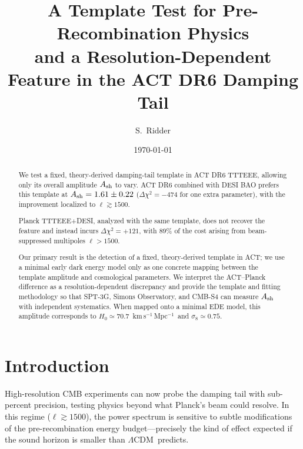 \documentclass[twocolumn,showpacs,preprintnumbers,amsmath,amssymb,prd]{revtex4-2}
\newcommand{\lcdm}{$\Lambda$CDM}
\newcommand{\kms}{km\,s$^{-1}$\,Mpc$^{-1}$}
\begin{document}
\title{A Template Test for Pre-Recombination Physics\\
and a Resolution-Dependent Feature in the ACT DR6 Damping Tail}

\author{S.~Ridder}

\date{\today}

\begin{abstract}
We test a fixed, theory-derived damping-tail template in ACT DR6 TTTEEE, 
allowing only its overall amplitude $A_{\rm sh}$ to vary. ACT DR6 combined 
with DESI BAO prefers this template at $A_{\rm sh} = 1.61 \pm 0.22$ 
($\Delta\chi^2 = -474$ for one extra parameter), with the improvement 
localized to $\ell \gtrsim 1500$. 

Planck TTTEEE+DESI, analyzed with the same template, does not recover the 
feature and instead incurs $\Delta\chi^2 = +121$, with 89\% of the cost 
arising from beam-suppressed multipoles $\ell > 1500$. 

Our primary result is the detection of a fixed, theory-derived template 
in ACT; we use a minimal early dark energy model only as one concrete 
mapping between the template amplitude and cosmological parameters. 
We interpret the ACT--Planck difference as a resolution-dependent 
discrepancy and provide the template and fitting methodology so that 
SPT-3G, Simons Observatory, and CMB-S4 can measure $A_{\rm sh}$ with 
independent systematics. When mapped onto a minimal EDE model, this amplitude corresponds to 
$H_0 \simeq 70.7$~\kms\ and $\sigma_8 \simeq 0.75$.
\end{abstract}

\maketitle

\section{Introduction}
\label{sec:intro}

High-resolution CMB experiments can now probe the damping tail with sub-percent precision, testing physics beyond what Planck's beam could resolve. In this regime ($\ell \gtrsim 1500$), the power spectrum is sensitive to subtle modifications of the pre-recombination energy budget---precisely the kind of effect expected if the sound horizon is smaller than \lcdm\ predicts.
\end{document}

